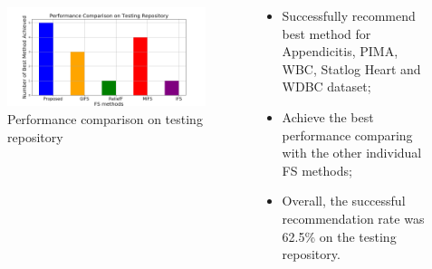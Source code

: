 \documentclass[aspectratio=1610]{beamer}
\begin{document}
\begin{frame}
\begin{columns}
\begin{column}{0.6\textwidth}
	\begin{figure}[tb]
		\centering
		\includegraphics[width=0.6\columnwidth]{Figures/Best_Method_Achieved.png}
		\caption{\scriptsize{Performance comparison on testing repository}}
	\end{figure}
	\end{column}
	\begin{column}{0.5\textwidth}
		\begin{itemize}\footnotesize
			\item Successfully recommend best method for Appendicitis, PIMA, WBC, Statlog Heart and WDBC dataset;
			\vspace{0.4cm}
			\item Achieve the best performance comparing with the other individual FS methods;
			\vspace{0.4cm}
			\item Overall, the successful recommendation rate was 62.5\% on the testing repository.
		\end{itemize}
	\end{column}
\end{columns}
\end{frame}
\end{document}
